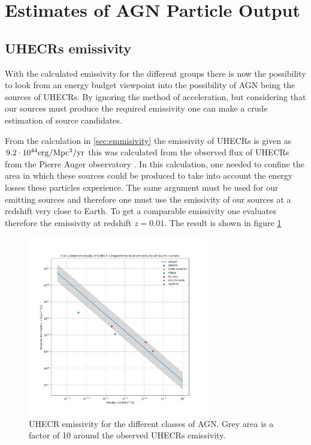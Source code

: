 \section{Estimates of AGN Particle Output}
\subsection{UHECRs emissivity}
With the calculated emissivity for the different groups there is now the possibility to look from an energy budget viewpoint into the possibility of AGN being the sources of UHECRs. 
By ignoring the method of acceleration, but considering that our sources must produce the required emissivity one can make a crude estimation of source candidates. 

From the calculation in \ref{sec:emmisivity} the emissivity of UHECRs is given as $9.2 \cdot 10^{44}\rm erg/\rm Mpc^3\rm /yr$ this was calculated from the observed flux of UHECRs from the Pierre Auger observatory \cite{thepierreaugercollaboration2017pierre}.
In this calculation, one needed to confine the area in which these sources could be produced to take into account the energy losses these particles experience. The same argument must be used 
for our emitting sources and therefore one must use the emissivity of our sources at a redshift very close to Earth. To get a comparable emissivity one evaluates therefore the emissivity at redshift $z=0.01$. The result is shown in figure \ref*{fig:UHECR}

\begin{figure}[H]
    \centering
    \includegraphics[width = 0.7\textwidth]{new_plots/L_n_uhecr_calc.png}
    \caption{UHECR emissivity for the different classes of AGN.  Grey area is a factor of 10 around the observed UHECRs emissivity.}
    \label{fig:UHECR}
\end{figure}

